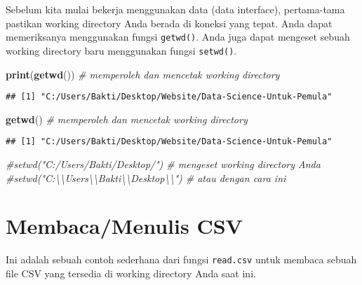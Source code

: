 \documentclass[
]{book}
\newenvironment{Shaded}{\begin{snugshade}}{\end{snugshade}}
\newcommand{\CommentTok}[1]{\textcolor[rgb]{0.56,0.35,0.01}{\textit{#1}}}
\newcommand{\KeywordTok}[1]{\textcolor[rgb]{0.13,0.29,0.53}{\textbf{#1}}}
\newcommand{\NormalTok}[1]{#1}
\begin{document}
Sebelum kita mulai bekerja menggunakan data (data interface), pertama-tama pastikan working directory Anda berada di koneksi yang tepat. Anda dapat memeriksanya menggunakan fungsi \texttt{getwd()}. Anda juga dapat mengeset sebuah working directory baru menggunakan fungsi \texttt{setwd()}.

\begin{Shaded}
\begin{Highlighting}[]
\KeywordTok{print}\NormalTok{(}\KeywordTok{getwd}\NormalTok{())                                    }\CommentTok{# memperoleh dan mencetak working directory}
\end{Highlighting}
\end{Shaded}

\begin{verbatim}
## [1] "C:/Users/Bakti/Desktop/Website/Data-Science-Untuk-Pemula"
\end{verbatim}

\begin{Shaded}
\begin{Highlighting}[]
\KeywordTok{getwd}\NormalTok{()                                           }\CommentTok{# memperoleh dan mencetak working directory }
\end{Highlighting}
\end{Shaded}

\begin{verbatim}
## [1] "C:/Users/Bakti/Desktop/Website/Data-Science-Untuk-Pemula"
\end{verbatim}

\begin{Shaded}
\begin{Highlighting}[]
\CommentTok{#setwd("C:/Users/Bakti/Desktop/")                 # mengeset working directory Anda }
\CommentTok{#setwd("C:\textbackslash{}\textbackslash{}Users\textbackslash{}\textbackslash{}Bakti\textbackslash{}\textbackslash{}Desktop\textbackslash{}\textbackslash{}")             # atau dengan cara ini}
\end{Highlighting}
\end{Shaded}

\hypertarget{membacamenulis-csv}{%
\section{Membaca/Menulis CSV}\label{membacamenulis-csv}}

Ini adalah sebuah contoh sederhana dari fungsi \texttt{read.csv} untuk membaca sebuah file CSV yang tersedia di working directory Anda saat ini.
\end{document}
